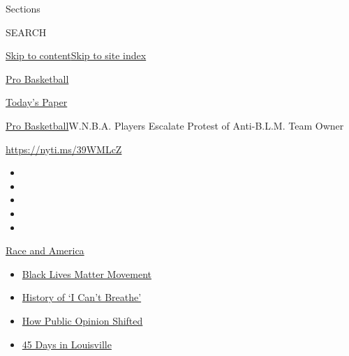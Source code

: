Sections

SEARCH

\protect\hyperlink{site-content}{Skip to
content}\protect\hyperlink{site-index}{Skip to site index}

\href{https://www.nytimes3xbfgragh.onion/section/sports/basketball}{Pro
Basketball}

\href{https://myaccount.nytimes3xbfgragh.onion/auth/login?response_type=cookie\&client_id=vi}{}

\href{https://www.nytimes3xbfgragh.onion/section/todayspaper}{Today's
Paper}

\href{/section/sports/basketball}{Pro Basketball}\textbar{}W.N.B.A.
Players Escalate Protest of Anti-B.L.M. Team Owner

\url{https://nyti.ms/39WMLcZ}

\begin{itemize}
\item
\item
\item
\item
\item
\end{itemize}

\href{https://www.nytimes3xbfgragh.onion/news-event/george-floyd-protests-minneapolis-new-york-los-angeles?action=click\&pgtype=Article\&state=default\&region=TOP_BANNER\&context=storylines_menu}{Race
and America}

\begin{itemize}
\tightlist
\item
  \href{https://www.nytimes3xbfgragh.onion/interactive/2020/07/03/us/george-floyd-protests-crowd-size.html?action=click\&pgtype=Article\&state=default\&region=TOP_BANNER\&context=storylines_menu}{Black
  Lives Matter Movement}
\item
  \href{https://www.nytimes3xbfgragh.onion/interactive/2020/06/28/us/i-cant-breathe-police-arrest.html?action=click\&pgtype=Article\&state=default\&region=TOP_BANNER\&context=storylines_menu}{History
  of `I Can't Breathe'}
\item
  \href{https://www.nytimes3xbfgragh.onion/interactive/2020/06/10/upshot/black-lives-matter-attitudes.html?action=click\&pgtype=Article\&state=default\&region=TOP_BANNER\&context=storylines_menu}{How
  Public Opinion Shifted}
\item
  \href{https://www.nytimes3xbfgragh.onion/interactive/2020/07/16/us/black-lives-matter-protests-louisville-breonna-taylor.html?action=click\&pgtype=Article\&state=default\&region=TOP_BANNER\&context=storylines_menu}{45
  Days in Louisville}
\end{itemize}


